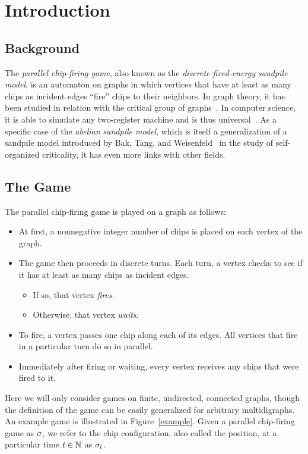 \section{Introduction}

\subsection*{Background}
The \emph{parallel chip-firing game}, also known as the \emph{discrete
  fixed-energy sandpile model}, is an automaton on graphs in which vertices
that have at least as many chips as incident edges ``fire'' chips to their
neighbors. In graph theory, it has been studied in relation with the critical
group of graphs~\cite{biggs}. In computer science, it is able to simulate any
two-register machine and is thus universal~\cite{universality}. As a specific
case of the \emph{abelian sandpile model}, which is itself a generalization of
a sandpile model introduced by Bak, Tang, and Weisenfeld~\cite{BTWcriticality,
  BTWmoreCriticality} in the study of self-organized criticality, it has even
more links with other fields.

\subsection*{The Game}
The parallel chip-firing game is played on a graph as follows:
\begin{itemize}
\item At first, a nonnegative integer number of chips is placed on each vertex
  of the graph.
\item The game then proceeds in discrete turns. Each turn, a vertex checks to
  see if it has at least as many chips as incident edges.
\begin{itemize}
\item If so, that vertex \emph{fires}.
\item Otherwise, that vertex \emph{waits}.
\end{itemize}
\item To fire, a vertex passes one chip along each of its edges. All vertices
  that fire in a particular turn do so in parallel.
\item Immediately after firing or waiting, every vertex receives any chips that
  were fired to it.
\end{itemize}
Here we will only consider games on finite, undirected, connected graphs,
though the definition of the game can be easily generalized for arbitrary
multidigraphs. An example game is illustrated in Figure~\ref{example}. Given a
parallel chip-firing game as $\sigma$, we refer to the chip configuration, also
called the position, at a particular time $t \in \mathbb{N}$ as $\sigma_{t}$.

